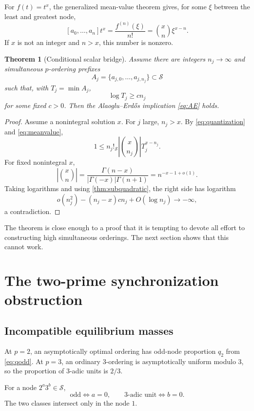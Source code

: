 \documentclass[11pt]{article}
\newtheorem{theorem}{Theorem}[section]
\theoremstyle{definition}
\theoremstyle{remark}
\newcommand{\calS}{\mathcal S}
\newcommand{\abs}[1]{\left|#1\right|}
\begin{document}
For $f(t)=t^x$, the generalized mean-value theorem gives, for some $\xi$ between the least and greatest node,
\begin{equation}\label{eq:meanvalue}
 [a_0,\dots,a_n]t^x
   =\frac{f^{(n)}(\xi)}{n!}
   =\binom xn\xi^{x-n}.
\end{equation}
If $x$ is not an integer and $n>x$, this number is nonzero.

\begin{theorem}[Conditional scalar bridge]\label{thm:scalar-bridge}
Assume there are integers $n_j\to\infty$ and simultaneous $p$-ordering prefixes
\[
       A_j=\{a_{j,0},\dots,a_{j,n_j}\}\subset\calS
\]
such that, with $T_j=\min A_j$,
\[
       \log T_j\ge c n_j
\]
for some fixed $c>0$.  Then the Alaoglu--Erd\H{o}s implication \eqref{eq:AE} holds.
\end{theorem}
\begin{proof}
Assume a nonintegral solution $x$.  For $j$ large, $n_j>x$.  By \eqref{eq:quantization} and \eqref{eq:meanvalue},
\[
  1\le n_j!_{\calS}\abs{\binom{x}{n_j}}T_j^{x-n_j}.
\]
For fixed nonintegral $x$,
\[
   \abs{\binom xn}
   =\frac{\Gamma(n-x)}{\abs{\Gamma(-x)}\Gamma(n+1)}
   =n^{-x-1+o(1)}.
\]
Taking logarithms and using \cref{thm:subquadratic}, the right side has logarithm
\[
      o(n_j^2)-(n_j-x)c n_j+O(\log n_j)\longrightarrow-\infty,
\]
a contradiction.
\end{proof}

The theorem is close enough to a proof that it is tempting to devote all effort to constructing high simultaneous orderings.  The next section shows that this cannot work.

\section{The two-prime synchronization obstruction}

\subsection{Incompatible equilibrium masses}
At $p=2$, an asymptotically optimal ordering has odd-node proportion $q_2$ from \eqref{eq:qodd}.  At $p=3$, an ordinary $3$-ordering is asymptotically uniform modulo $3$, so the proportion of $3$-adic units is $2/3$.

For a node $2^a3^b\in\calS$,
\[
  \text{odd}\iff a=0,
  \qquad
  \text{$3$-adic unit}\iff b=0.
\]
The two classes intersect only in the node $1$.
\end{document}
